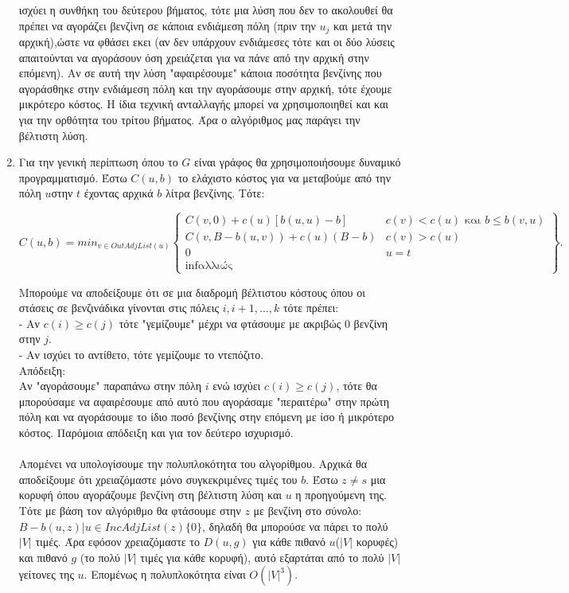 \documentclass[11pt]{article}
\begin{document}
\begin{enumerate}
    ισχύει η συνθήκη του δεύτερου βήματος, τότε μια λύση που δεν το ακολουθεί θα πρέπει να αγοράζει βενζίνη σε κάποια ενδιάμεση πόλη (πριν την $u_j$ και μετά την αρχική),ώστε να φθάσει εκει (αν δεν υπάρχουν ενδιάμεσες τότε και οι δύο λύσεις απαιτούνται να αγοράσουν όση χρειάζεται για να πάνε από την αρχική στην επόμενη). Αν σε αυτή την λύση "αφαιρέσουμε" κάποια ποσότητα βενζίνης που αγοράσθηκε στην ενδιάμεση πόλη και την αγοράσουμε στην αρχική, τότε έχουμε μικρότερο κόστος. Η ίδια τεχνική ανταλλαγής μπορεί να χρησιμοποιηθεί και και για την ορθότητα του τρίτου βήματος. Άρα ο αλγόριθμος μας παράγει την βέλτιστη λύση.
    \item Για την γενική περίπτωση όπου το $G$ είναι γράφος θα χρησιμοποιήσουμε δυναμικό
    προγραμματισμό. Έστω $C(u,b)$ το ελάχιστο κόστος για να μεταβούμε από την πόλη $u$στην
    $t$ έχοντας αρχικά $b$ λίτρα βενζίνης. Τότε:\\
    \begin{center}
      \[ C(u,b) = min_{v\in OutAdjList(u)}
      \left\{
      \begin{array}{ll}
        C(v,0)+c(u)[b(u,u)-b] & c(v) < c(u) \text{ και } b \leq b(v,u) \\
        C(v,B-b(u,v))+c(u)(B-b) & c(v)>c(u)\\
        0 & u=t\\
        \inf \text{αλλιώς}
      \end{array} 
      \right\}. 
      \]
    \end{center}
    Μπορούμε να αποδείξουμε ότι σε μια διαδρομή βέλτιστου κόστους όπου οι στάσεις σε
βενζινάδικα γίνονται στις πόλεις $i,i+1,...,k$ τότε πρέπει:\\
- Αν $c(i) \geq c(j)$ τότε "γεμίζουμε" μέχρι να φτάσουμε με ακριβώς 0 βενζίνη στην $j$.\\
- Αν ισχύει το αντίθετο, τότε γεμίζουμε το ντεπόζιτο.\\
Απόδειξη:\\
Αν "αγοράσουμε" παραπάνω στην πόλη $i$ ενώ ισχύει $c(i) \geq c(j)$, τότε θα μπορούσαμε να
αφαιρέσουμε από αυτό που αγοράσαμε "περαιτέρω" στην πρώτη πόλη και να αγοράσουμε
το ίδιο ποσό βενζίνης στην επόμενη με ίσο ή μικρότερο κόστος. Παρόμοια απόδειξη και
για τον δεύτερο ισχυρισμό. \\ \\
Απομένει να υπολογίσουμε την πολυπλοκότητα του αλγορίθμου. Αρχικά θα αποδείξουμε
ότι χρειαζόμαστε μόνο συγκεκριμένες τιμές του $b$. Έστω $z \neq s$ μια κορυφή όπου αγοράζουμε βενζίνη στη βέλτιστη λύση και $u$ η προηγούμενη της. Τότε με βάση τον αλγόριθμο
θα φτάσουμε στην $z$ με βενζίνη στο σύνολο: $B-b(u,z)|u \in IncAdjList(z)\{0\}$, δηλαδή θα
μπορούσε να πάρει το πολύ $|V|$ τιμές. Άρα εφόσον χρειαζόμαστε το $D(u,g)$
για κάθε πιθανό $u$($|V|$ κορυφές) και πιθανό $g$ (το πολύ $|V|$ τιμές για κάθε κορυφή), αυτό
εξαρτάται από το πολύ $|V|$ γείτονες της $u$. Επομένως η πολυπλοκότητα είναι $O(|V|^3)$.
\end{enumerate}
\newpage
\end{document}
